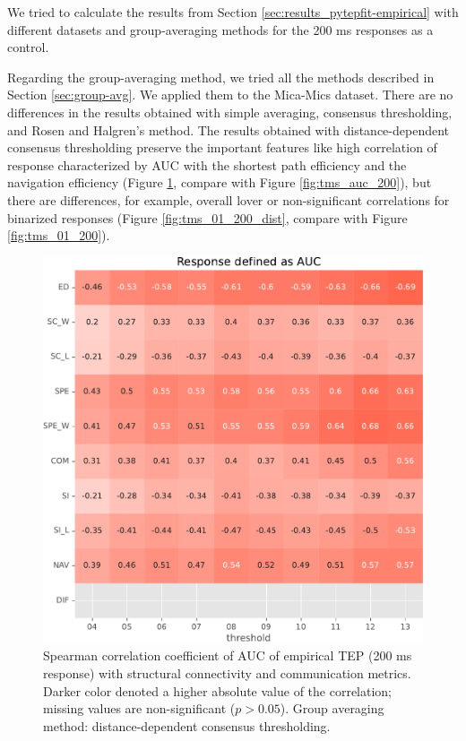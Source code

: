 We tried to calculate the results from Section \ref{sec:results_pytepfit-empirical} with different datasets and group-averaging methods for the 200 ms responses as a control.  

Regarding the group-averaging method, we tried all the methods described in Section \ref{sec:group-avg}. We applied them to the Mica-Mics dataset. There are no differences in the results obtained with simple averaging, consensus thresholding, and Rosen and Halgren's method. The results obtained with distance-dependent consensus thresholding preserve the important features like high correlation of response characterized by AUC with the shortest path efficiency and the navigation efficiency (Figure \ref{fig:tms_auc_200_dist}, compare with Figure \ref{fig:tms_auc_200}), but there are differences, for example, overall lover or non-significant correlations for binarized responses (Figure \ref{fig:tms_01_200_dist}, compare with Figure \ref{fig:tms_01_200}).

\begin{figure}
    \centering
    \includegraphics[width=\textwidth]{images/nootebook_generated/pytepfit_results/empirical/200/not_over_threshold_nan/Mica-Mics_dist/Response defined as AUC.pdf}
    \caption[TEPs AUC (200 ms) correlations (dist)]{Spearman correlation coefficient of AUC of empirical TEP (200 ms response) with structural connectivity and communication metrics. Darker color denoted a higher absolute value of the correlation; missing values are non-significant ($p>0.05$). Group averaging method: distance-dependent consensus thresholding.}
    \label{fig:tms_auc_200_dist}
\end{figure}

